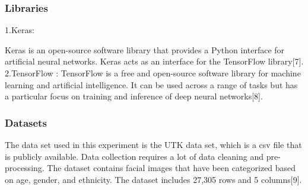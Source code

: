 \begin{introduction}
\subsubsection{Libraries}

\hfill \break
1.Keras: 

Keras is an open-source software library that provides a Python interface for artificial neural networks. Keras acts as an interface for the TensorFlow library[7].
\hfill \break
\hfill \break
2.TensorFlow : TensorFlow is a free and open-source software library for machine learning and artificial intelligence. It can be used across a range of tasks but has a particular focus on training and inference of deep neural networks[8].
\hfill \break
\hfill \break

\subsubsection{Datasets}
The data set used in this experiment is the UTK data set, which is a csv file that is publicly available. Data collection requires a lot of data cleaning and pre-processing. The dataset contains facial images that have been categorized based on age, gender, and ethnicity. The dataset includes 27,305 rows and 5 columns[9].



\end{introduction}
